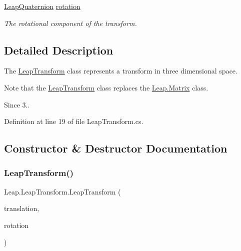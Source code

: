 \begin{DoxyCompactItemize}
\mbox{\hyperlink{struct_leap_1_1_leap_quaternion}{Leap\+Quaternion}} \mbox{\hyperlink{struct_leap_1_1_leap_transform_a69917840386ec2421d3886be4ec7833a}{rotation}}
\begin{DoxyCompactList}\small\item\em The rotational component of the transform. \end{DoxyCompactList}\end{DoxyCompactItemize}


\subsection{Detailed Description}
The \mbox{\hyperlink{struct_leap_1_1_leap_transform}{Leap\+Transform}} class represents a transform in three dimensional space. 

Note that the \mbox{\hyperlink{struct_leap_1_1_leap_transform}{Leap\+Transform}} class replaces the \mbox{\hyperlink{struct_leap_1_1_matrix}{Leap.\+Matrix}} class. \begin{DoxySince}{Since}
3.. 
\end{DoxySince}


Definition at line 19 of file Leap\+Transform.\+cs.



\subsection{Constructor \& Destructor Documentation}
\mbox{\label{struct_leap_1_1_leap_transform_a202169e88920074c2ca30144a4de20df}} 
\subsubsection{\texorpdfstring{LeapTransform()}{LeapTransform()}\hspace{0.1cm}{\footnotesize\ttfamily [1/2]}}
{\footnotesize\ttfamily Leap.\+Leap\+Transform.\+Leap\+Transform (\begin{DoxyParamCaption}\item[{\mbox{\hyperlink{struct_leap_1_1_vector}{Vector}}}]{translation,  }\item[{\mbox{\hyperlink{struct_leap_1_1_leap_quaternion}{Leap\+Quaternion}}}]{rotation }\end{DoxyParamCaption})}



